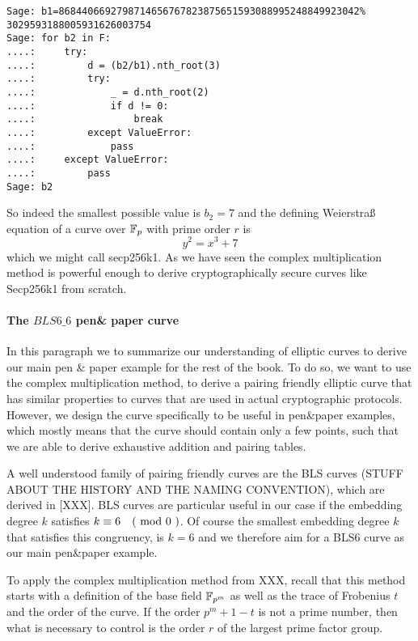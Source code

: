 \begin{example}
\begin{verbatim}
Sage: b1=8684406692798714656767823875651593088995248849923042%
3029593188005931626003754
Sage: for b2 in F:
....:     try:
....:         d = (b2/b1).nth_root(3)
....:         try:
....:             _ = d.nth_root(2)
....:             if d != 0:
....:                 break
....:         except ValueError:
....:             pass
....:     except ValueError:
....:         pass
Sage: b2
\end{verbatim}
So indeed the smallest possible value is $b_2=7$ and the defining Weierstraß equation of a curve over $\mathbb{F}_p$ with prime order $r$ is 
$$
y^2 = x^3 + 7
$$
which we might call secp256k1. As we have seen the complex multiplication method is powerful enough to derive cryptographically secure curves like Secp256k1 from scratch.
\end{example}

\paragraph{The $BLS6\_6$ pen\& paper curve}
In this paragraph we to summarize our understanding of elliptic curves to derive our main pen \& paper example for the rest of the book. To do so, we want to use the complex multiplication method, to derive a pairing friendly elliptic curve that has similar properties to curves that are used in actual cryptographic protocols. However, we design the curve specifically to be useful in pen\&{}paper examples, which mostly means that the curve should contain only a few points, such that we are able to derive exhaustive addition and pairing tables.

A well understood family of pairing friendly curves are the BLS curves (STUFF ABOUT THE HISTORY AND THE NAMING CONVENTION), which are derived in [XXX]. BLS curves are particular useful in our case if the embedding degree $k$ satisfies $k \equiv 6 \quad \text{( mod } 0 \text{ )}$. Of course the smallest embedding degree $k$ that satisfies this congruency, is $k=6$ and we therefore aim for a BLS6 curve as our main pen\&{}paper example. 

To apply the complex multiplication method from XXX, recall that this method starts with a definition of the base field $\mathbb{F}_{p^m}$ as well as the trace of Frobenius $t$ and the order of the curve. If the order $p^m+1-t$ is not a prime number, then  what is necessary to control is the order $r$ of the largest prime factor group. 


